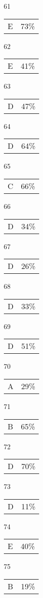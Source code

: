 \documentclass[12pt]{article}
\begin{document}
\begin{multicols}{5}
\begin{enumerate}
\item[61] \begin{tabular}{cc} E & 73\%\end{tabular}
\item[62] \begin{tabular}{cc} E & 41\%\end{tabular}
\item[63] \begin{tabular}{cc} D & 47\%\end{tabular}
\item[64] \begin{tabular}{cc} D & 64\%\end{tabular}
\item[65] \begin{tabular}{cc} C & 66\%\end{tabular}
\item[]
\item[66] \begin{tabular}{cc} D & 34\%\end{tabular}
\item[67] \begin{tabular}{cc} D & 26\%\end{tabular}
\item[68] \begin{tabular}{cc} D & 33\%\end{tabular}
\item[69] \begin{tabular}{cc} D & 51\%\end{tabular}
\item[70] \begin{tabular}{cc} A & 29\%\end{tabular}
\item[]
\item[71] \begin{tabular}{cc} B & 65\%\end{tabular}
\item[72] \begin{tabular}{cc} D & 70\%\end{tabular}
\item[73] \begin{tabular}{cc} D & 11\%\end{tabular}
\item[74] \begin{tabular}{cc} E & 40\%\end{tabular}
\item[75] \begin{tabular}{cc} B & 19\%\end{tabular}

\end{enumerate}
\end{multicols}
\end{document}
